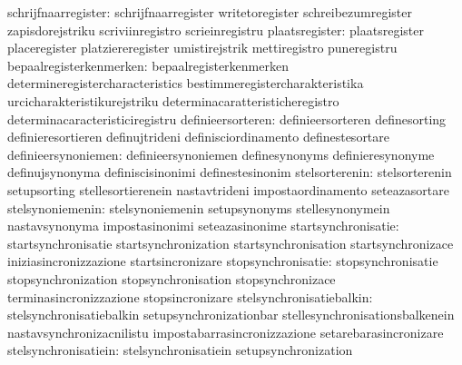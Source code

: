              schrijfnaarregister: schrijfnaarregister              writetoregister
                                  schreibezumregister              zapisdorejstriku
                                  scriviinregistro                 scrieinregistru
                  plaatsregister: plaatsregister                   placeregister
                                  platziereregister                umistirejstrik
                                  mettiregistro                    puneregistru
         bepaalregisterkenmerken: bepaalregisterkenmerken          determineregistercharacteristics
                                  bestimmeregistercharakteristika  urcicharakteristikurejstriku
                                  determinacaratteristicheregistro determinacaracteristiciregistru
               definieersorteren: definieersorteren                definesorting
                                  definieresortieren               definujtrideni
                                  definisciordinamento             definestesortare
             definieersynoniemen: definieersynoniemen              definesynonyms
                                  definieresynonyme                definujsynonyma
                                  definiscisinonimi                definestesinonim
                  stelsorterenin: stelsorterenin                   setupsorting
                                  stellesortierenein               nastavtrideni
                                  impostaordinamento               seteazasortare
                stelsynoniemenin: stelsynoniemenin                 setupsynonyms
                                  stellesynonymein                 nastavsynonyma
                                  impostasinonimi                  seteazasinonime
             startsynchronisatie: startsynchronisatie              startsynchronization
                                  startsynchronisation             startsynchronizace
                                  iniziasincronizzazione           startsincronizare
              stopsynchronisatie: stopsynchronisatie               stopsynchronization
                                  stopsynchronisation              stopsynchronizace
                                  terminasincronizzazione          stopsincronizare
        stelsynchronisatiebalkin: stelsynchronisatiebalkin         setupsynchronizationbar
                                  stellesynchronisationsbalkenein  nastavsynchronizacnilistu
                                  impostabarrasincronizzazione     setarebarasincronizare
            stelsynchronisatiein: stelsynchronisatiein             setupsynchronization
